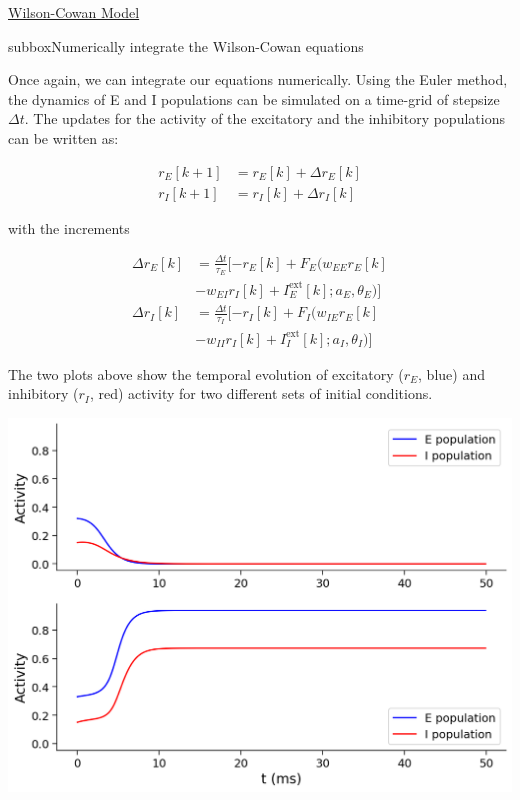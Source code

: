 \begin{textbox}{\href{https://compneuro.neuromatch.io/tutorials/W2D4_DynamicNetworks/chapter_title.html}{Wilson-Cowan Model } }
\begin{subbox}{subbox}{Numerically integrate the Wilson-Cowan equations}
\scriptsize

Once again, we can integrate our equations numerically. Using the Euler method, the dynamics of E and I populations can be simulated on a time-grid of stepsize $\Delta t$. The updates for the activity of the excitatory and the inhibitory populations can be written as:

\begin{align*}
r_E[k+1] &= r_E[k] + \Delta r_E[k]\\
r_I[k+1] &= r_I[k] + \Delta r_I[k] 
\end{align*}

with the increments

\begin{align*}
\Delta r_E[k] &= \frac{\Delta t}{\tau_E}[-r_E[k] + F_E(w_{EE}r_E[k] \\
&-w_{EI}r_I[k] + I^{\text{ext}}_E[k];a_E,\theta_E)]\\
\Delta r_I[k] &= \frac{\Delta t}{\tau_I}[-r_I[k] + F_I(w_{IE}r_E[k] \\
&-w_{II}r_I[k] + I^{\text{ext}}_I[k];a_I,\theta_I)] 
\end{align*}

The two plots above show the temporal evolution of excitatory ($r_E$, blue) and inhibitory ($r_I$, red) activity for two different sets of initial conditions.

\begin{center}
\includegraphics[scale=0.3]{Figures/DN/DN_Figure6.png}
\end{center}
\end{subbox}

\end{textbox}
